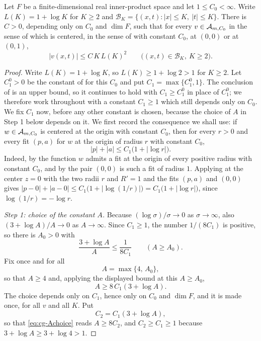 \begin{lemma}
Let $F$ be a finite-dimensional real inner-product space and let
$1\le C_0<\infty$. Write $L(K)=1+\log K$ for $K\ge2$ and
$\mathcal B_K=\{(x,t):|x|\le K,\ |t|\le K\}$. There is $C>0$, depending only on
$C_0$ and $\dim F$, such that for every $v\in\mathcal{A}_{m,C_0}$ in the sense of
 which is centered, in the sense of 
with constant $C_0$, at $(0,0)$ or at $(0,1)$,
\begin{equation}\label{eq:centered-growth}
  |v(x,t)|\le C\,K\,L(K)^2\qquad\bigl((x,t)\in\mathcal B_K,\ K\ge2\bigr).
\end{equation}
\end{lemma}
\begin{proof}
Write $L(K)=1+\log K$, so $L(K)\ge1+\log2>1$ for $K\ge2$. Let $C_1^0>0$ be the
constant of  for this $C_0$ and put
$C_1=\max\{C_1^0,1\}$. The conclusion of  is an
upper bound, so it continues to hold with $C_1\ge C_1^0$ in place of $C_1^0$;
we therefore work throughout with a constant $C_1\ge1$ which still depends only
on $C_0$. We fix $C_1$ now, before any other constant is chosen, because the
choice of $A$ in Step 1 below depends on it. We first record
the consequence we shall use: if $w\in\mathcal{A}_{m,C_0}$ is centered at the origin
with constant $C_0$, then for every $r>0$ and every fit $(p,a)$ for $w$ at the
origin of radius $r$ with constant $C_0$,
\begin{equation}\label{eq:cg-ofb}
  |p|+|a|\le C_1\bigl(1+|\log r|\bigr).
\end{equation}
Indeed, by  the function $w$ admits a fit at the origin of
every positive radius with constant $C_0$, and by  the
pair $(0,0)$ is such a fit of radius $1$. Applying
 at the center $z=0$ with the two radii $r$ and
$R'=1$ and the fits $(p,a)$ and $(0,0)$ gives
$|p-0|+|a-0|\le C_1\bigl(1+|\log(1/r)|\bigr)=C_1\bigl(1+|\log r|\bigr)$, since
$\log(1/r)=-\log r$.

\emph{Step 1: choice of the constant $A$.}
Because $(\log\sigma)/\sigma\to0$ as $\sigma\to\infty$, also
$(3+\log A)/A\to0$ as $A\to\infty$. Since $C_1\ge1$, the number $1/(8C_1)$ is
positive, so there is $A_0>0$ with
\[
  \frac{3+\log A}{A}\le\frac1{8C_1}\qquad(A\ge A_0).
\]
Fix once and for all
\[
  A=\max\{4,\,A_0\},
\]
so that $A\ge4$ and, applying the displayed bound at this $A\ge A_0$,
\begin{equation}\label{eq:cg-Achoice}
  A\ge8\,C_1(3+\log A).
\end{equation}
The choice depends only on $C_1$, hence only on $C_0$ and $\dim F$, and it is
made once, for all $v$ and all $K$. Put
\[
  C_2=C_1(3+\log A),
\]
so that \eqref{eq:cg-Achoice} reads $A\ge8C_2$, and
$C_2\ge C_1\ge1$ because $3+\log A\ge3+\log4>1$.


\end{proof}
